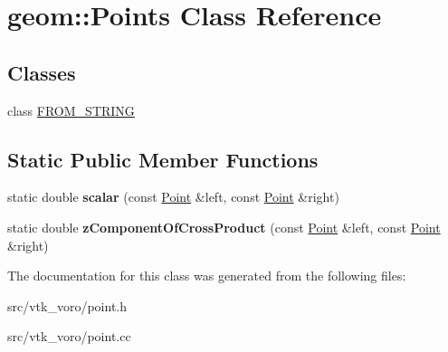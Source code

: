 \hypertarget{classgeom_1_1Points}{}\section{geom\+:\+:Points Class Reference}
\label{classgeom_1_1Points}
\subsection*{Classes}
\begin{DoxyCompactItemize}
\item 
class \hyperlink{classgeom_1_1Points_1_1FROM__STRING}{F\+R\+O\+M\+\_\+\+S\+T\+R\+I\+NG}
\end{DoxyCompactItemize}
\subsection*{Static Public Member Functions}
\begin{DoxyCompactItemize}
\item 
static double {\bfseries scalar} (const \hyperlink{classgeom_1_1Point}{Point} \&left, const \hyperlink{classgeom_1_1Point}{Point} \&right)\hypertarget{classgeom_1_1Points_a64d4ecd2153a4eb97db68bfe55b46ff4}{}\label{classgeom_1_1Points_a64d4ecd2153a4eb97db68bfe55b46ff4}

\item 
static double {\bfseries z\+Component\+Of\+Cross\+Product} (const \hyperlink{classgeom_1_1Point}{Point} \&left, const \hyperlink{classgeom_1_1Point}{Point} \&right)\hypertarget{classgeom_1_1Points_a98b0db670bd20bd2280e96fbd114a4f6}{}\label{classgeom_1_1Points_a98b0db670bd20bd2280e96fbd114a4f6}

\end{DoxyCompactItemize}


The documentation for this class was generated from the following files\+:\begin{DoxyCompactItemize}
\item 
src/vtk\+\_\+voro/point.\+h\item 
src/vtk\+\_\+voro/point.\+cc\end{DoxyCompactItemize}
